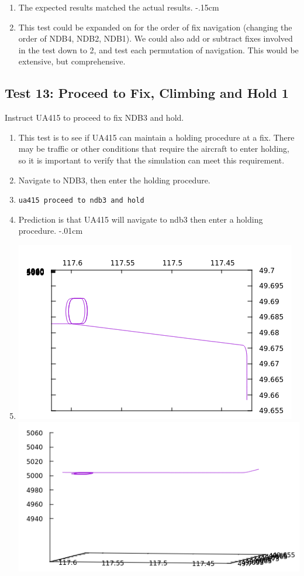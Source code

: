 \documentclass[letterpaper, 12pt]{article}
\begin{document}
\begin{enumerate}
\item The expected results matched the actual results.
\itemsep-.15cm
\item This test could be expanded on for the order of fix navigation (changing the order of NDB4, NDB2, NDB1). We could also add or subtract fixes involved in the test down to 2, and test each permutation of navigation. This would be extensive, but comprehensive.
\end{enumerate}

\subsection{Test 13: Proceed to Fix, Climbing and Hold 1}
Instruct UA415 to proceed to fix NDB3 and hold.
\begin{enumerate}\itemsep-.15cm
\item This test is to see if UA415 can maintain a holding procedure at a fix. There may be traffic or other conditions that require the aircraft to enter holding, so it is important to verify that the simulation can meet this requirement.
\item Navigate to NDB3, then enter the holding procedure.
\item \verb!ua415 proceed to ndb3 and hold!
\item Prediction is that UA415 will navigate to ndb3 then enter a holding procedure.
\itemsep-.01cm
\item \includegraphics[scale=.6,valign=t]{test13_1.png} \includegraphics[scale=.57,valign=t]{test13_2.png}

\end{enumerate}
\end{document}
